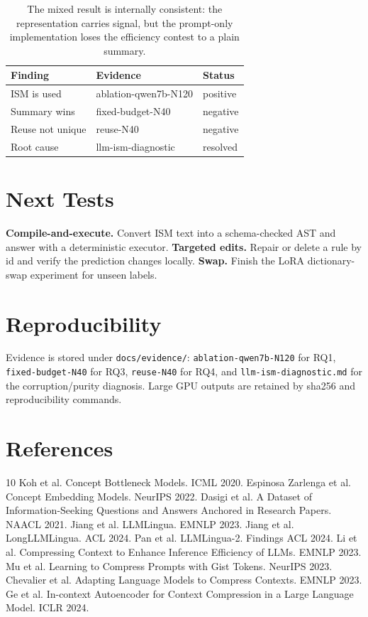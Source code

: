 \documentclass[10pt,twocolumn]{article}
\newcommand{\ism}{\textsc{ISM}}
\begin{document}
\begin{table}[t]
\centering
\scriptsize
\begin{tabular}{lll}
\toprule
Finding & Evidence & Status \\
\midrule
\ism{} is used & ablation-qwen7b-N120 & positive \\
Summary wins & fixed-budget-N40 & negative \\
Reuse not unique & reuse-N40 & negative \\
Root cause & llm-ism-diagnostic & resolved \\
\bottomrule
\end{tabular}
\caption{The mixed result is internally consistent: the representation carries
signal, but the prompt-only implementation loses the efficiency contest to a
plain summary.}
\label{tab:ledger}
\end{table}

\section{Next Tests}

\textbf{Compile-and-execute.} Convert \ism{} text into a schema-checked AST and
answer with a deterministic executor.  \textbf{Targeted edits.} Repair or delete
a rule by id and verify the prediction changes locally.  \textbf{Swap.} Finish
the LoRA dictionary-swap experiment for unseen labels.

\section{Reproducibility}

Evidence is stored under \texttt{docs/evidence/}: \texttt{ablation-qwen7b-N120}
for RQ1, \texttt{fixed-budget-N40} for RQ3, \texttt{reuse-N40} for RQ4, and
\texttt{llm-ism-diagnostic.md} for the corruption/purity diagnosis.  Large GPU
outputs are retained by sha256 and reproducibility commands.

\section*{References}
\scriptsize
\begin{thebibliography}{10}
 Koh et al. Concept Bottleneck Models. ICML 2020.
 Espinosa Zarlenga et al. Concept Embedding Models. NeurIPS 2022.
 Dasigi et al. A Dataset of Information-Seeking Questions and Answers Anchored in Research Papers. NAACL 2021.
 Jiang et al. LLMLingua. EMNLP 2023.
 Jiang et al. LongLLMLingua. ACL 2024.
 Pan et al. LLMLingua-2. Findings ACL 2024.
 Li et al. Compressing Context to Enhance Inference Efficiency of LLMs. EMNLP 2023.
 Mu et al. Learning to Compress Prompts with Gist Tokens. NeurIPS 2023.
 Chevalier et al. Adapting Language Models to Compress Contexts. EMNLP 2023.
 Ge et al. In-context Autoencoder for Context Compression in a Large Language Model. ICLR 2024.
\end{thebibliography}
\end{document}
